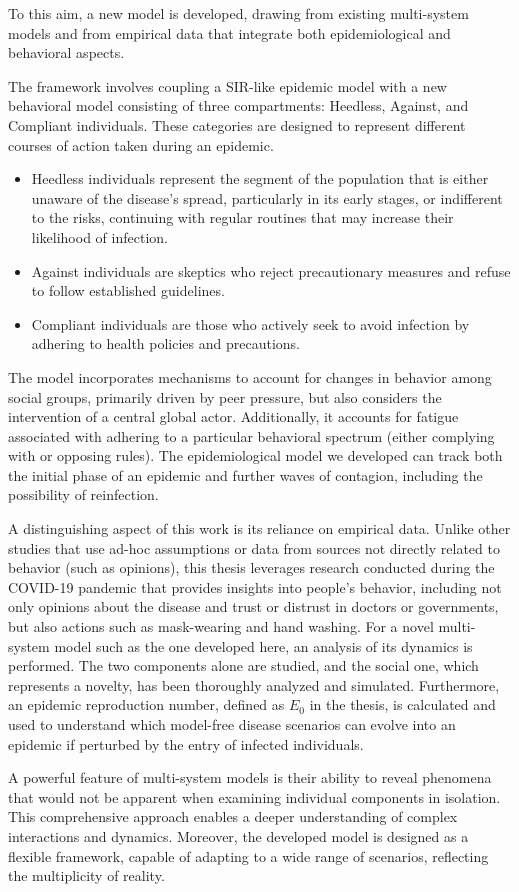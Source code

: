 To this aim, a new model is developed, drawing from existing multi-system models and from empirical data that integrate both epidemiological and behavioral aspects.

The framework involves coupling a SIR-like epidemic model with a new behavioral model consisting of three compartments: Heedless, Against, and Compliant individuals. These categories are designed to represent different courses of action taken during an epidemic.
\begin{itemize}
	\item Heedless individuals represent the segment of the population that is either unaware of the disease’s spread, particularly in its early stages, or indifferent to the risks, continuing with regular routines that may increase their likelihood of infection.
	\item Against individuals are skeptics who reject precautionary measures and refuse to follow established guidelines.
	\item Compliant individuals are those who actively seek to avoid infection by adhering to health policies and precautions.
\end{itemize}

The model incorporates mechanisms to account for changes in behavior among social groups, primarily driven by peer pressure, but also considers the intervention of a central global actor. Additionally, it accounts for fatigue associated with adhering to a particular behavioral spectrum (either complying with or opposing rules). The epidemiological model we developed can track both the initial phase of an epidemic and further waves of contagion, including the possibility of reinfection.

A distinguishing aspect of this work is its reliance on empirical data. Unlike other studies that use ad-hoc assumptions or data from sources not directly related to behavior (such as opinions), this thesis leverages research conducted during the COVID-19 pandemic that provides insights into people's behavior, including not only opinions about the disease and trust or distrust in doctors or governments, but also actions such as mask-wearing and hand washing. For a novel multi-system model such as the one developed here, an analysis of its dynamics is performed. The two components alone are studied, and the social one, which represents a novelty, has been thoroughly analyzed and simulated. Furthermore, an epidemic reproduction number, defined as $E_0$ in the thesis, is calculated and used to understand which model-free disease scenarios can evolve into an epidemic if perturbed by the entry of infected individuals.

A powerful feature of multi-system models is their ability to reveal phenomena that would not be apparent when examining individual components in isolation. This comprehensive approach enables a deeper understanding of complex interactions and dynamics. Moreover, the developed model is designed as a flexible framework, capable of adapting to a wide range of scenarios, reflecting the multiplicity of reality. 

